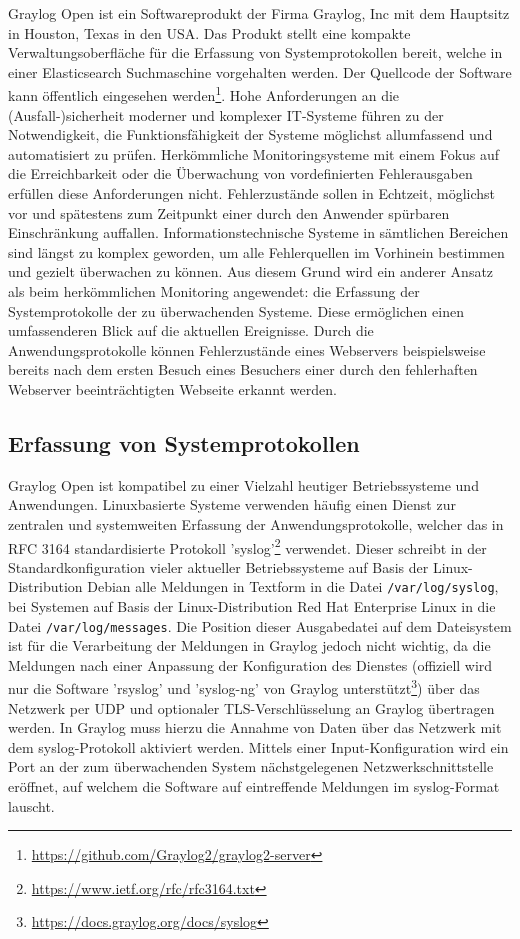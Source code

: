 Graylog Open ist ein Softwareprodukt der Firma Graylog, Inc mit dem Hauptsitz in Houston, Texas in den USA. Das Produkt stellt eine kompakte Verwaltungsoberfläche für die Erfassung von Systemprotokollen bereit, welche in einer Elasticsearch Suchmaschine vorgehalten werden. Der Quellcode der Software kann öffentlich eingesehen werden\footnote{\url{https://github.com/Graylog2/graylog2-server}}. Hohe Anforderungen an die (Ausfall-)sicherheit moderner und komplexer IT-Systeme führen zu der Notwendigkeit, die Funktionsfähigkeit der Systeme möglichst allumfassend und automatisiert zu prüfen. Herkömmliche Monitoringsysteme mit einem Fokus auf die Erreichbarkeit oder die Überwachung von vordefinierten Fehlerausgaben erfüllen diese Anforderungen nicht. Fehlerzustände sollen in Echtzeit, möglichst vor und spätestens zum Zeitpunkt einer durch den Anwender spürbaren Einschränkung auffallen. Informationstechnische Systeme in sämtlichen Bereichen sind längst zu komplex geworden, um alle Fehlerquellen im Vorhinein bestimmen und gezielt überwachen zu können. Aus diesem Grund wird ein anderer Ansatz als beim herkömmlichen Monitoring angewendet: die Erfassung der Systemprotokolle der zu überwachenden Systeme. Diese ermöglichen einen umfassenderen Blick auf die aktuellen Ereignisse. Durch die Anwendungsprotokolle können Fehlerzustände eines Webservers beispielsweise bereits nach dem ersten Besuch eines Besuchers einer durch den fehlerhaften Webserver beeinträchtigten Webseite erkannt werden.

\subsection{Erfassung von Systemprotokollen}

Graylog Open ist kompatibel zu einer Vielzahl heutiger Betriebssysteme und Anwendungen. Linuxbasierte Systeme verwenden häufig einen Dienst zur zentralen und systemweiten Erfassung der Anwendungsprotokolle, welcher das in RFC 3164 standardisierte Protokoll 'syslog'\footnote{\url{https://www.ietf.org/rfc/rfc3164.txt}} verwendet. Dieser schreibt in der Standardkonfiguration vieler aktueller Betriebssysteme auf Basis der Linux-Distribution Debian alle Meldungen in Textform in die Datei \lstinline{/var/log/syslog}, bei Systemen auf Basis der Linux-Distribution Red Hat Enterprise Linux in die Datei \lstinline{/var/log/messages}. Die Position dieser Ausgabedatei auf dem Dateisystem ist für die Verarbeitung der Meldungen in Graylog jedoch nicht wichtig, da die Meldungen nach einer Anpassung der Konfiguration des Dienstes (offiziell wird nur die Software 'rsyslog' und 'syslog-ng' von Graylog unterstützt\footnote{\url{https://docs.graylog.org/docs/syslog}}) über das Netzwerk per UDP und optionaler TLS-Verschlüsselung an Graylog übertragen werden. In Graylog muss hierzu die Annahme von Daten über das Netzwerk mit dem syslog-Protokoll aktiviert werden. Mittels einer Input-Konfiguration wird ein Port an der zum überwachenden System nächstgelegenen Netzwerkschnittstelle eröffnet, auf welchem die Software auf eintreffende Meldungen im syslog-Format lauscht.

